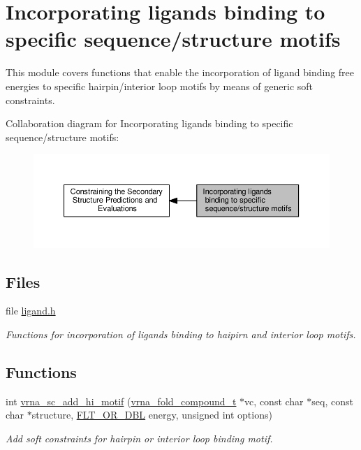 \hypertarget{group__ligands}{}\section{Incorporating ligands binding to specific sequence/structure motifs}
\label{group__ligands}


This module covers functions that enable the incorporation of ligand binding free energies to specific hairpin/interior loop motifs by means of generic soft constraints.  


Collaboration diagram for Incorporating ligands binding to specific sequence/structure motifs\+:
\nopagebreak
\begin{figure}[H]
\begin{center}
\leavevmode
\includegraphics[width=350pt]{group__ligands}
\end{center}
\end{figure}
\subsection*{Files}
\begin{DoxyCompactItemize}
\item 
file \hyperlink{ligand_8h}{ligand.\+h}
\begin{DoxyCompactList}\small\item\em Functions for incorporation of ligands binding to haipirn and interior loop motifs. \end{DoxyCompactList}\end{DoxyCompactItemize}
\subsection*{Functions}
\begin{DoxyCompactItemize}
\item 
int \hyperlink{group__ligands_gaa6ff0113a3a76dc0b8d62961f4e1dfa0}{vrna\+\_\+sc\+\_\+add\+\_\+hi\+\_\+motif} (\hyperlink{group__fold__compound_ga1b0cef17fd40466cef5968eaeeff6166}{vrna\+\_\+fold\+\_\+compound\+\_\+t} $\ast$vc, const char $\ast$seq, const char $\ast$structure, \hyperlink{group__data__structures_ga31125aeace516926bf7f251f759b6126}{F\+L\+T\+\_\+\+O\+R\+\_\+\+D\+B\+L} energy, unsigned int options)
\begin{DoxyCompactList}\small\item\em Add soft constraints for hairpin or interior loop binding motif. \end{DoxyCompactList}\end{DoxyCompactItemize}


